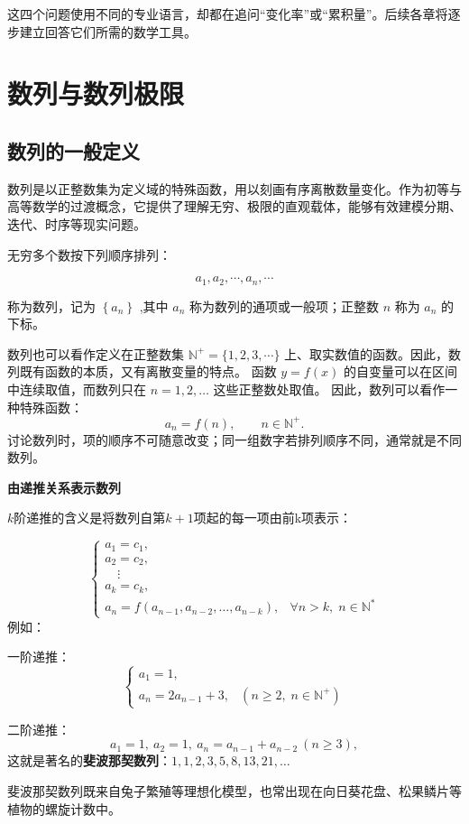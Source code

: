\documentclass[fontset=fandol]{ctexart}
\newenvironment{custom}[1]{\par\noindent\textbf{#1}\quad}{\par\vspace{0.8em}}
\begin{document}
这四个问题使用不同的专业语言，却都在追问“变化率”或“累积量”。后续各章将逐步建立回答它们所需的数学工具。

\clearpage
\section{数列与数列极限}



\subsection{数列的一般定义}

数列是以正整数集为定义域的特殊函数，用以刻画有序离散数量变化。作为初等与高等数学的过渡概念，它提供了理解无穷、极限的直观载体，能够有效建模分期、迭代、时序等现实问题。




\begin{definition}[数列]
无穷多个数按下列顺序排列：

$$
a_1, a_2, \cdots, a_n, \cdots
$$

称为数列，记为 $\left\{a_n\right\}$ ,其中 $a_n$ 称为数列的通项或一般项；正整数 $n$ 称为 $a_n$ 的下标。

数列也可以看作定义在正整数集 $\mathbb{N}^+=\{1,2,3,\cdots\}$ 上、取实数值的函数。因此，数列既有函数的本质，又有离散变量的特点。 函数 $y=f(x)$ 的自变量可以在区间中连续取值，而数列只在 $n=1,2,\ldots$ 这些正整数处取值。 因此，数列可以看作一种特殊函数：
\[
a_n=f(n),\qquad n\in\mathbb{N}^+.
\]
讨论数列时，项的顺序不可随意改变；同一组数字若排列顺序不同，通常就是不同数列。
\end{definition}


\begin{custom}{由递推关系表示数列}
	
	$k$阶递推的含义是将数列自第$k+1$项起的每一项由前k项表示：
	
	\begin{equation*}
		\begin{cases}
			a_1 = c_1, \\
			a_2 = c_2, \\
			\quad \vdots \\
			a_k = c_k, \\
			a_n = f(a_{n-1}, a_{n-2}, \dots, a_{n-k}), & \forall n > k, \; n \in \mathbb{N}^*
		\end{cases}
	\end{equation*}
	例如：
	
	一阶递推：
	\begin{equation*}
		\begin{cases}
			a_1 = 1, \\
			a_n = 2 a_{n-1} + 3, & (n \ge 2, \; n \in \mathbb{N}^+)
		\end{cases}
	\end{equation*}
	
	二阶递推：
	\[
	a_1 = 1,\ a_2 = 1,\ a_n = a_{n-1} + a_{n-2}\ (n \geq 3),
	\]
	这就是著名的\textbf{斐波那契数列}：\(1,1,2,3,5,8,13,21,\dots\)
	
	斐波那契数列既来自兔子繁殖等理想化模型，也常出现在向日葵花盘、松果鳞片等植物的螺旋计数中。
\end{custom}
\end{document}

